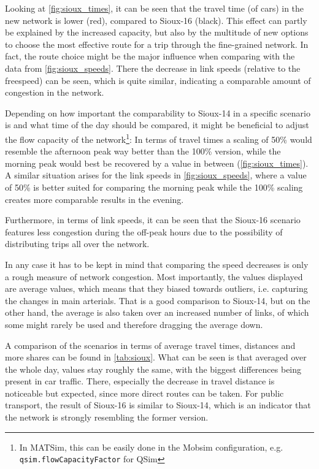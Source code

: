 Looking at \cref{fig:sioux_times}, it can be seen that the travel time (of cars) in
the new network is lower (red), compared to Sioux-16 (black). This effect can partly
be explained by the increased capacity, but also by the multitude of new options
to choose the most effective route for a trip through the fine-grained network. In
fact, the route choice might be the major influence when comparing with the data
from \cref{fig:sioux_speeds}. There the decrease in link speeds (relative to the freespeed) can be seen, which
is quite similar, indicating a comparable amount of congestion in the network.

Depending on how important the comparability to Sioux-14 in a specific scenario
is and what time of the day should be compared, it might be beneficial to adjust
the flow capacity of the network\footnote{In MATSim, this can be easily done
in the Mobsim configuration, e.g. \texttt{qsim.flowCapacityFactor} for QSim}:
In terms of travel times a scaling of 50\% would resemble the afternoon peak
way better than the 100\% version, while the morning peak would best be recovered
by a value in between (\cref{fig:sioux_times}). A similar situation arises for the
link speeds in \cref{fig:sioux_speeds}, where a value of 50\% is better suited for
comparing the morning peak while the 100\% scaling creates more comparable
results in the evening.

Furthermore, in terms of link speeds, it can be seen that the Sioux-16 scenario
features less congestion during the off-peak hours due to the possibility of
distributing trips all over the network.

In any case it has to be kept in mind that comparing the speed decreases is only
a rough measure of network congestion. Most importantly, the values displayed are
average values, which means that they biased towards outliers, i.e. capturing the
changes in main arterials. That is a good comparison to Sioux-14, but on the other
hand, the average is also taken over an increased number of links, of which some might rarely be
used and therefore dragging the average down.

A comparison of the scenarios in terms of average travel times, distances and more
shares can be found in \cref{tab:sioux}. What can be seen is that averaged over
the whole day, values stay roughly the same, with the biggest differences being
present in car traffic. There, especially the decrease in travel distance is
noticeable but expected, since more direct routes can be taken.
For public transport, the result of Sioux-16 is similar to Sioux-14, which is
an indicator that the network is strongly resembling the former version.


